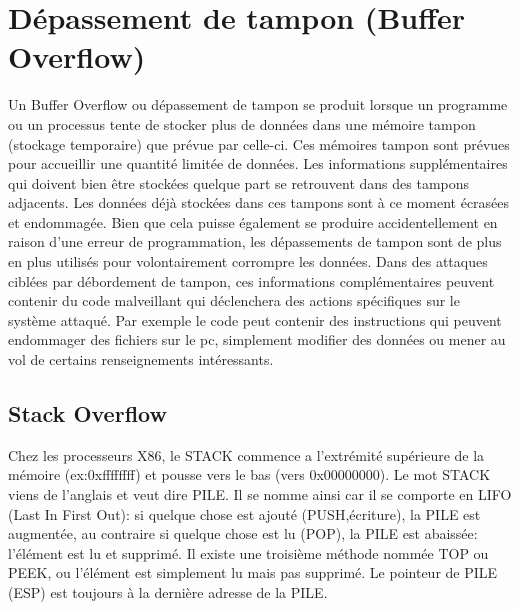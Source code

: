 

\newpage
\section{Dépassement de tampon (Buffer Overflow)}\label{vulnerabilites:applicatives:buffer-overflow}

Un Buffer Overflow ou dépassement de tampon se produit lorsque un programme ou un processus tente de stocker plus de données dans une mémoire tampon (stockage temporaire) que prévue par celle-ci. Ces mémoires tampon sont prévues pour accueillir une quantité limitée de données. Les informations supplémentaires qui doivent bien être stockées quelque part se retrouvent dans des tampons adjacents. Les données déjà stockées dans ces tampons sont à ce moment écrasées et endommagée. Bien que cela puisse également se produire accidentellement en raison d'une erreur de programmation, les dépassements de tampon sont de plus en plus utilisés pour volontairement corrompre les données. Dans des attaques ciblées par débordement de tampon,   ces informations complémentaires peuvent contenir du code malveillant qui déclenchera des actions spécifiques sur le système attaqué. Par exemple le code peut contenir des instructions qui peuvent endommager des fichiers sur le pc, simplement modifier des données ou mener au vol de certains renseignements intéressants.


\subsection{Stack Overflow}\label{vulnerabilites:applicatives:buffer-overflow:stack}

Chez les processeurs X86, le STACK commence a l’extrémité supérieure de la mémoire (ex:0xffffffff) et pousse vers le bas (vers 0x00000000). Le mot STACK viens de l'anglais et veut dire PILE. Il se nomme ainsi car il se comporte en LIFO (Last In First Out): si quelque chose est ajouté (PUSH,écriture), la PILE est augmentée, au contraire si quelque chose est lu (POP), la PILE est abaissée: l'élément est lu et supprimé. Il existe une troisième méthode nommée TOP ou PEEK, ou l'élément est simplement lu mais pas supprimé. Le pointeur de PILE (ESP) est toujours à la dernière adresse de la PILE.

